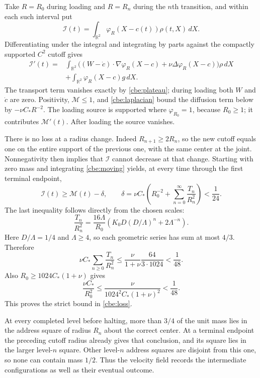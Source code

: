 Take $R=R_0$ during loading and $R=R_n$ during the $n$th
transition, and within each such interval put
\[
 \mathcal I(t)=\int_{\mathbb R^2}
            \varphi_R(X-c(t))\rho(t,X)\,dX.
\]
Differentiating under the integral and integrating by parts against
the compactly supported $C^2$ cutoff gives
\begin{equation}\label{cbe:moving}
\begin{aligned}
 \mathcal I'(t)
  ={}&\int_{\mathbb R^2}
       \bigl((W-\dot c)\cdot\nabla\varphi_R(X-c)
                    +\nu\Delta\varphi_R(X-c)\bigr)\rho\,dX\\
   &+\int_{\mathbb R^2}\varphi_R(X-c)g\,dX.
\end{aligned}
\end{equation}
The transport term vanishes exactly by \eqref{cbe:plateau}; during
loading both $W$ and $\dot c$ are zero.  Positivity,
$\mathcal M\le1$, and \eqref{cbe:laplacian} bound the diffusion
term below by $-\nu C_*R^{-2}$.  The loading source is supported
where $\varphi_{R_0}=1$, because $R_0\ge1$; it contributes
$\mathcal M'(t)$.  After loading the source vanishes.

There is no loss at a radius change.  Indeed
$R_{n+1}\ge2R_n$, so the new cutoff equals one on the entire support
of the previous one, with the same center at the joint.  Nonnegativity
then implies that $\mathcal I$ cannot decrease at that change.
Starting with zero mass and integrating \eqref{cbe:moving} yields,
at every time through the first terminal endpoint,
\begin{equation}\label{cbe:loss}
 \mathcal I(t)\ge\mathcal M(t)-\delta,\qquad
 \delta=\nu C_*\left(R_0^{-2}
                   +\sum_{n=0}^{\infty}\frac{T_n}{R_n^2}\right)
       <\frac1{24}.
\end{equation}
The last inequality follows directly from the chosen scales:
\[
 \frac{T_n}{R_n^2}=
 \frac{16\Lambda}{R_0}
      \left(K_0D(D/\Lambda)^n+2\Lambda^{-n}\right).
\]
Here $D/\Lambda=1/4$ and $\Lambda\ge4$, so each geometric series
has sum at most $4/3$.  Therefore
\[
 \nu C_*\sum_{n\ge0}\frac{T_n}{R_n^2}
 \le\frac{\nu}{1+\nu}\frac{64}{3\cdot1024}<\frac1{48}.
\]
Also $R_0\ge1024C_*(1+\nu)$ gives
\[
 \frac{\nu C_*}{R_0^2}
 \le\frac{\nu}{1024^2C_*(1+\nu)^2}<\frac1{48}.
\]
This proves the strict bound in \eqref{cbe:loss}.

At every completed level before halting, more than $3/4$ of the
unit mass lies in the address square of radius $R_n$ about the
correct center.  At a terminal endpoint the preceding cutoff radius
already gives that conclusion, and its square lies in the larger
level-$n$ square.  Other level-$n$ address squares are disjoint
from this one, so none can contain mass $1/2$.  Thus the velocity
field records the intermediate configurations as well as their
eventual outcome.

